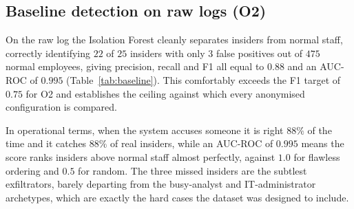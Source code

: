 \documentclass[10pt,a4paper]{article}
\begin{document}
\subsection{Baseline detection on raw logs (O2)}
On the raw log the Isolation Forest cleanly separates insiders from normal staff, correctly identifying $22$ of $25$ insiders with only $3$ false positives out of $475$ normal employees, giving precision, recall and F1 all equal to $\mathbf{0.88}$ and an AUC-ROC of $\mathbf{0.995}$ (Table~\ref{tab:baseline}). This comfortably exceeds the F1 target of $0.75$ for O2 and establishes the ceiling against which every anonymised configuration is compared.

\begin{table}[tb]
\centering
\caption{Baseline detection performance on raw logs, with the confusion matrix (500 entities, 25 insiders).}
\label{tab:baseline}
\small
{}
\end{table}

In operational terms, when the system accuses someone it is right $88\%$ of the time and it catches $88\%$ of real insiders, while an AUC-ROC of $0.995$ means the score ranks insiders above normal staff almost perfectly, against $1.0$ for flawless ordering and $0.5$ for random. The three missed insiders are the subtlest exfiltrators, barely departing from the busy-analyst and IT-administrator archetypes, which are exactly the hard cases the dataset was designed to include.
\end{document}
